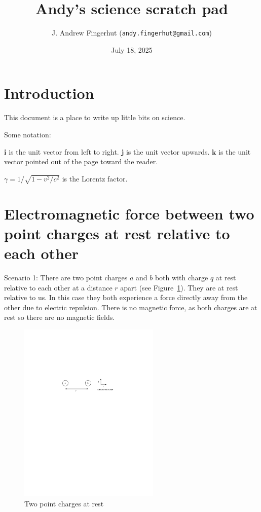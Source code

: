 \documentclass[a4paper]{article}
\title{Andy's science scratch pad}
\author{J. Andrew Fingerhut (\texttt{andy.fingerhut@gmail.com})}
\date{
        July 18, 2025
}
\theoremstyle{plain}
\theoremstyle{definition}
\newcommand{\ihat}{\mathbf{i}}
\newcommand{\jhat}{\mathbf{j}}
\newcommand{\khat}{\mathbf{k}}
\begin{document}
\maketitle


\tableofcontents

\section{Introduction}
\label{sec:intro}

This document is a place to write up little bits on science.

Some notation:

$\ihat$ is the unit vector from left to right.
$\jhat$ is the unit vector upwards.
$\khat$ is the unit vector pointed out of the page toward the reader.

$\gamma = 1/\sqrt{1-v^2/c^2}$ is the Lorentz factor.


\section{Electromagnetic force between two point charges at rest relative to each other}
\label{sec:twocharges}

Scenario 1: There are two point charges $a$ and $b$ both with charge
$q$ at rest relative to each other at a distance $r$ apart (see
Figure~\ref{fig:two-charges-at-rest}).  They are at rest relative
to us.  In this case they both experience a force directly away from
the other due to electric repulsion.  There is no magnetic force, as
both charges are at rest so there are no magnetic fields.

\begin{figure}[ht]
	\centering
	\includegraphics[width=0.6\textwidth]{two-charges-at-rest-cropped.pdf}
	\caption{Two point charges at rest}
	\label{fig:two-charges-at-rest}
\end{figure}
\end{document}

